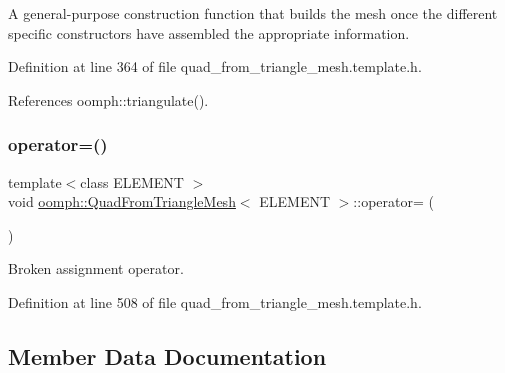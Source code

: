 A general-\/purpose construction function that builds the mesh once the different specific constructors have assembled the appropriate information. 



Definition at line 364 of file quad\+\_\+from\+\_\+triangle\+\_\+mesh.\+template.\+h.



References oomph\+::triangulate().

\mbox{\label{classoomph_1_1QuadFromTriangleMesh_a873e7ed187ae267ad985e61e71e3b90c}} 
\subsubsection{\texorpdfstring{operator=()}{operator=()}}
{\footnotesize\ttfamily template$<$class E\+L\+E\+M\+E\+NT $>$ \\
void \hyperlink{classoomph_1_1QuadFromTriangleMesh}{oomph\+::\+Quad\+From\+Triangle\+Mesh}$<$ E\+L\+E\+M\+E\+NT $>$\+::operator= (\begin{DoxyParamCaption}\item[{const \hyperlink{classoomph_1_1QuadFromTriangleMesh}{Quad\+From\+Triangle\+Mesh}$<$ E\+L\+E\+M\+E\+NT $>$ \&}]{ }\end{DoxyParamCaption})\hspace{0.3cm}{\ttfamily [inline]}}



Broken assignment operator. 



Definition at line 508 of file quad\+\_\+from\+\_\+triangle\+\_\+mesh.\+template.\+h.



\subsection{Member Data Documentation}
\mbox{\label{classoomph_1_1QuadFromTriangleMesh_a4a4b155283407ae37a804d258ac8c6dd}} 
